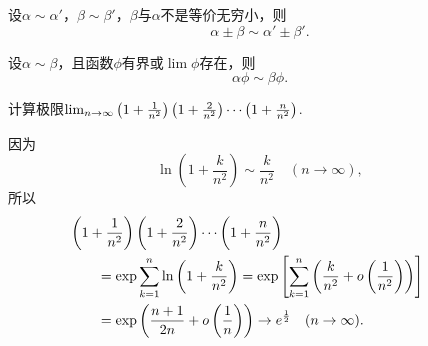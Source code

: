 \begin{proposition}[和差代替规则]\label{theorem:极限.无穷小的比较4}
设\(\alpha\sim\alpha'\)，\(\beta\sim\beta'\)，\(\beta\)与\(\alpha\)不是等价无穷小，则\begin{equation*}
	\alpha\pm\beta\sim\alpha'\pm\beta'.
\end{equation*}
\end{proposition}

\begin{proposition}[因式代替规则]\label{theorem:极限.无穷小的比较5}
设\(\alpha\sim\beta\)，且函数\(\phi\)有界或\(\lim\phi\)存在，则\begin{equation*}
	\alpha \phi \sim \beta \phi.
\end{equation*}
\end{proposition}

\begin{example}
计算极限\(\lim_{n\to\infty} \left(1+\frac1{n^2}\right)\left(1+\frac2{n^2}\right)\dotsm\left(1+\frac{n}{n^2}\vphantom{\frac1{n^2}}\right)\).
\begin{solution}
因为\begin{equation*}
	\ln\left(1+\frac{k}{n^2}\right)
	\sim \frac{k}{n^2}
	\quad(n\to\infty),
\end{equation*}
所以\begin{align*}
	&\hspace{-20pt}
	\left(1+\frac1{n^2}\right)\left(1+\frac2{n^2}\right)\dotsm\left(1+\frac{n}{n^2}\vphantom{\frac1{n^2}}\right) \\
	&= \exp\sum_{k=1}^n \ln\left(1+\frac{k}{n^2}\right)
	= \exp\left[ \sum_{k=1}^n \left(\frac{k}{n^2} + o\left(\frac1{n^2}\right)\right) \right] \\
	&= \exp\left( \frac{n+1}{2n} + o\left(\frac1n\right) \right)
	\to e^{\frac12}
	\quad(n\to\infty).
\end{align*}
\end{solution}
\end{example}
